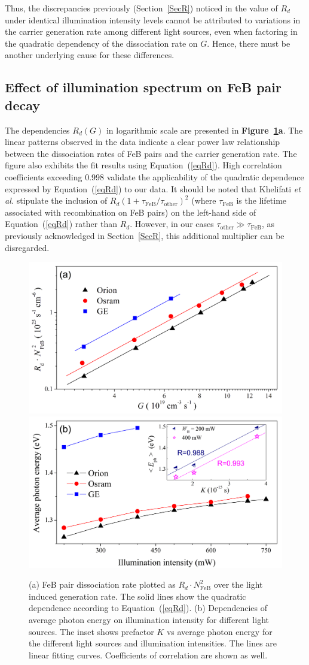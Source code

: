 \documentclass{WileyMSP-template}
\begin{document}
Thus, the discrepancies previously (Section~\ref{SecR}) noticed  in the value of $R_d$ under identical illumination intensity levels
cannot be attributed to variations in the carrier generation rate among different light sources,
even when factoring in the quadratic dependency of the dissociation rate on $G$.
Hence, there must be another underlying cause for these differences.


\subsection{Effect of illumination spectrum on FeB pair decay}\label{SecLast}

The dependencies $R_d (G)$ in logarithmic scale are presented in \textbf{Figure~\ref{fig6}a}.
The linear patterns observed in the data indicate a clear power law relationship between
the dissociation rates of FeB pairs and the carrier generation rate.
The figure also exhibits the fit results using Equation~(\ref{eqRd}).
High correlation coefficients exceeding 0.998 validate the applicability of the quadratic dependence expressed by Equation~(\ref{eqRd}) to our data.
It should be noted that Khelifati \emph{et al.} \cite{FeBKin2019} stipulate the inclusion of
$R_d\left(1+\tau_\mathrm{FeB}/\tau_\mathrm{other}\right)^2$ (where $\tau_\mathrm{FeB}$ is the lifetime associated with recombination on FeB pairs)
on the left-hand side of Equation~(\ref{eqRd}) rather than $R_d$.
However, in our cases $\tau_\mathrm{other}\gg \tau_\mathrm{FeB}$, as previously acknowledged in Section~\ref{SecR},
this additional multiplier can be disregarded.


\begin{figure}
\centering
  \includegraphics[width=0.4\linewidth]{Fig6a.png}
  \includegraphics[width=0.4\linewidth]{Fig6b.png}
  \caption{
  (a) FeB pair dissociation rate plotted as $R_d\cdot N_\mathrm{FeB}^2$ over the light induced
  generation rate. The solid lines show the quadratic dependence according to Equation~(\ref{eqRd}).
  (b) Dependencies of average photon energy on illumination intensity for different light sources.
  The inset shows prefactor $K$ vs average photon energy for the different light sources and illumination intensities.
  The lines are linear fitting curves. Coefficients of correlation are shown as well.
  }
  \label{fig6}
\end{figure}
\end{document}
